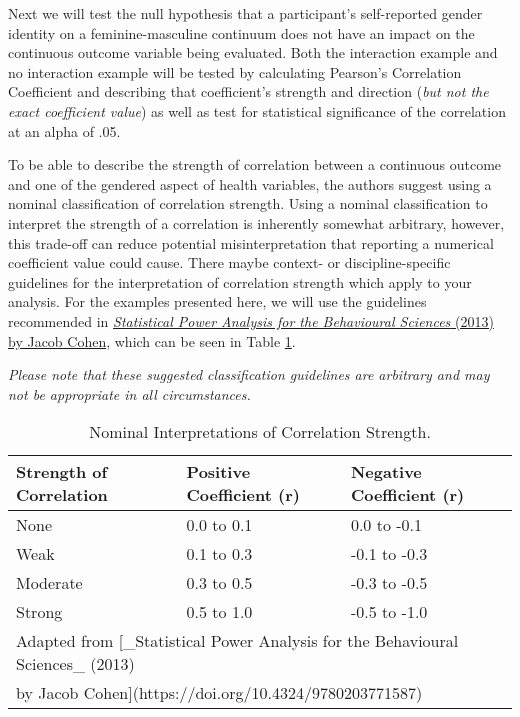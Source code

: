 \documentclass[
]{book}
\begin{document}
Next we will test the null hypothesis that a participant's self-reported gender identity on a feminine-masculine continuum does not have an impact on the continuous outcome variable being evaluated. Both the interaction example and no interaction example will be tested by calculating Pearson's Correlation Coefficient and describing that coefficient's strength and direction (\emph{{but not the exact coefficient value}}) as well as test for statistical significance of the correlation at an alpha of .05.

To be able to describe the strength of correlation between a continuous outcome and one of the gendered aspect of health variables, the authors suggest using a nominal classification of correlation strength. Using a nominal classification to interpret the strength of a correlation is inherently somewhat arbitrary, however, this trade-off can reduce potential misinterpretation that reporting a numerical coefficient value could cause. There maybe context- or discipline-specific guidelines for the interpretation of correlation strength which apply to your analysis. For the examples presented here, we will use the guidelines recommended in \href{https://doi.org/10.4324/9780203771587}{\emph{Statistical Power Analysis for the Behavioural Sciences} (2013) by Jacob Cohen}, which can be seen in Table \ref{tab:04-cohen}.

\emph{Please note that these suggested classification guidelines are arbitrary and may not be appropriate in all circumstances.}

\begin{table}

\caption{\label{tab:04-cohen}Nominal Interpretations of Correlation Strength.}
\centering
\begin{tabular}[t]{lll}
\toprule
Strength of Correlation & Positive Coefficient (r) & Negative Coefficient (r)\\
\midrule
None & 0.0 to 0.1 & 0.0 to -0.1\\
Weak & 0.1 to 0.3 & -0.1 to -0.3\\
Moderate & 0.3 to 0.5 & -0.3 to -0.5\\
Strong & 0.5 to 1.0 & -0.5 to -1.0\\
\bottomrule
\multicolumn{3}{l}{\textsuperscript{} Adapted from [\_Statistical Power Analysis for the Behavioural Sciences\_ (2013)}\\
\multicolumn{3}{l}{by Jacob Cohen](https://doi.org/10.4324/9780203771587)}\\
\end{tabular}
\end{table}
\end{document}
